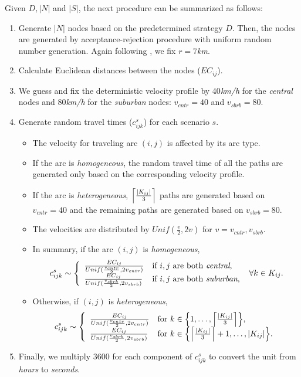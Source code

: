 Given $D,|N|$ and $|S|$, the next procedure can be summarized as follows:
\begin{enumerate}
	\item Generate $|N|$ nodes based on the predetermined strategy $D$. Then, the nodes are generated by acceptance-rejection procedure with uniform random number generation. Again following \cite{journal:TPP2017}, we fix $r=7$\textit{km}. 
	\item Calculate Euclidean distances between the nodes ($EC_{ij}$).
	\item We guess and fix the deterministic velocity profile by 40\textit{km/h} for the \textit{central} nodes and 80\textit{km/h} for the \textit{suburban} nodes: $v_{cntr}=40$ and $v_{sbrb}=80$.
	\item Generate random travel times ($c_{ijk}^{s}$) for each scenario $s$.
	\begin{itemize}
		\item The velocity for traveling arc $(i,j)$ is affected by its arc type.
		\item If the arc is \textit{homogeneous}, the random travel time of all the paths are generated only based on the corresponding velocity profile.
		\item If the arc is \textit{heterogeneous}, $\ceil*{\frac{|K_{ij}|}{3}}$ paths are generated based on $v_{cntr}=40$ and the remaining paths are generated based on $v_{sbrb}=80$. 
		\item The velocities are distributed by $Unif(\frac{v}{2},2v)$ for $v=v_{cntr},v_{sbrb}$.
		\item In summary, if the arc $(i,j)$ is \textit{homogeneous}, 
		\begin{align*}
		c_{ijk}^{s}\sim\left\{ \begin{array}{ll} \frac{EC_{ij}}{Unif(\frac{v_{cntr}}{2},2v_{cntr})} & \textrm{if $i,j$ are both \textit{central},} \\
		\frac{EC_{ij}}{Unif(\frac{v_{sbrb}}{2},2v_{sbrb})} & \textrm{if $i,j$ are both \textit{suburban},}	\end{array} \right.\ \forall k\in K_{ij}.
		\end{align*}
		\item Otherwise, if $(i,j)$ is \textit{heterogeneous},
		\begin{align*}
		c_{ijk}^{s}\sim\left\{ \begin{array}{ll} \frac{EC_{ij}}{Unif(\frac{v_{cntr}}{2},2v_{cntr})} & \textrm{for $k\in\left\{1,\ldots,\ceil*{\frac{|K_{ij}|}{3}}\right\}$,} \\
		\frac{EC_{ij}}{Unif(\frac{v_{sbrb}}{2},2v_{sbrb})} & \textrm{for $k\in\left\{\ceil*{\frac{|K_{ij}|}{3}}+1,\ldots,|K_{ij}|\right\}$.}	\end{array} \right.
		\end{align*}
	\end{itemize}
	\item Finally, we multiply 3600 for each component of $c_{ijk}^{s}$ to convert the unit from \textit{hours} to \textit{seconds}.
\end{enumerate}


